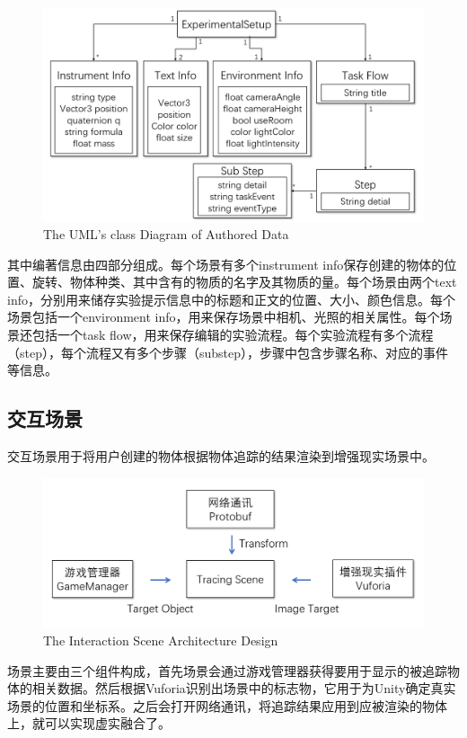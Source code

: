\begin{figure}[!htp]
  \centering
  \includegraphics[width=12cm]{figure/setupclass.png}
    {The UML's class Diagram of Authored Data}
 \label{fig:uml}
\end{figure}

其中编著信息由四部分组成。每个场景有多个instrument info保存创建的物体的位置、旋转、物体种类、其中含有的物质的名字及其物质的量。每个场景由两个text info，分别用来储存实验提示信息中的标题和正文的位置、大小、颜色信息。每个场景包括一个environment info，用来保存场景中相机、光照的相关属性。每个场景还包括一个task flow，用来保存编辑的实验流程。每个实验流程有多个流程（step），每个流程又有多个步骤（substep），步骤中包含步骤名称、对应的事件等信息。

\subsection{交互场景}
交互场景用于将用户创建的物体根据物体追踪的结果渲染到增强现实场景中。

\begin{figure}[!htp]
  \centering
  \includegraphics[width=12cm]{figure/tracingScene.png}
    {The Interaction Scene Architecture Design}
 \label{fig:int}
\end{figure}

场景主要由三个组件构成，首先场景会通过游戏管理器获得要用于显示的被追踪物体的相关数据。然后根据Vuforia识别出场景中的标志物，它用于为Unity确定真实场景的位置和坐标系。之后会打开网络通讯，将追踪结果应用到应被渲染的物体上，就可以实现虚实融合了。


